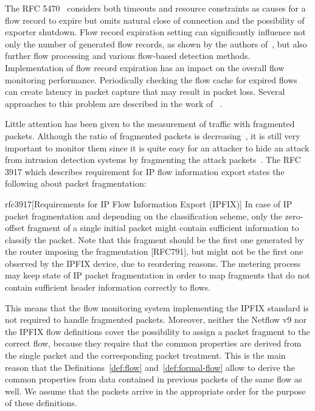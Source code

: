 The RFC 5470~\cite{rfc5470} considers both timeouts and resource constraints as causes for a flow record to expire but omits natural close of connection and the possibility of exporter shutdown. Flow record expiration setting can significantly influence not only the  number of generated flow records, as shown by the authors of~\cite{Rodriguez-2013-Empirical}, but also further flow processing and various flow-based detection methods. Implementation of flow record expiration has an impact on the overall flow monitoring performance. Periodically checking the flow cache for expired flows can create latency in packet capture that may result in packet loss. Several approaches to this problem are described in the work of \citeauthor{Molina-2006-Design}~\cite{Molina-2006-Design}.

Little attention has been given to the measurement of traffic with fragmented packets. Although the ratio of fragmented packets is decreasing~\cite{Murray-2012-State}, it is still very important to monitor them since it is quite easy for an attacker to hide an attack from intrusion detection systems by fragmenting the attack packets~\cite{Cheng-2012-Evasion}. The RFC 3917 which describes requirement for IP flow information export states the following about packet fragmentation:

\begin{displaycquote}{rfc3917}[Requirements for IP Flow Information Export (IPFIX)]
   In case of IP packet fragmentation and depending on the
   classification scheme, only the zero-offset fragment of a single
   initial packet might contain sufficient information to classify the
   packet.  Note that this fragment should be the first one generated by
   the router imposing the fragmentation [RFC791], but might not be the
   first one observed by the IPFIX device, due to reordering reasons.
   The metering process may keep state of IP packet fragmentation in
   order to map fragments that do not contain sufficient header
   information correctly to flows.
\end{displaycquote}

This means that the flow monitoring system implementing the IPFIX standard is not required to handle fragmented packets. Moreover, neither the Netflow v9 nor the IPFIX flow definitions cover the possibility to assign a packet fragment to the correct flow, because they require that the common properties are derived from the single packet and the corresponding packet treatment. This is the main reason that the Definitions~\ref{def:flow} and~\ref{def:formal-flow} allow to derive the common properties from data contained in previous packets of the same flow as well. We assume that the packets arrive in the appropriate order for the purpose of these definitions.

